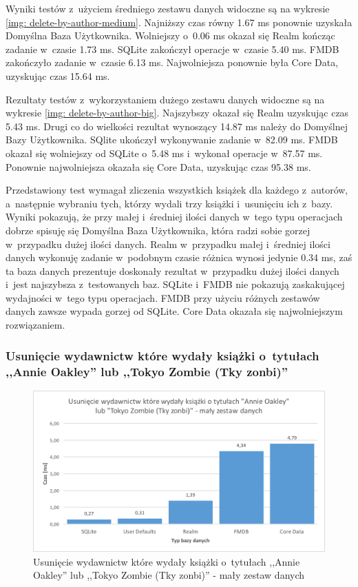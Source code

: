 Wyniki testów z~użyciem średniego zestawu danych widoczne są na wykresie \ref{img: delete-by-author-medium}. Najniższy czas równy 1.67 ms ponownie uzyskała Domyślna Baza Użytkownika. Wolniejszy o~0.06 ms okazał się Realm kończąc zadanie w~czasie 1.73 ms. SQLite zakończył operacje w~czasie 5.40 ms. FMDB zakończyło zadanie w~czasie 6.13 ms. Najwolniejsza ponownie była Core Data, uzyskując czas 15.64 ms.

Rezultaty testów z~wykorzystaniem dużego zestawu danych widoczne są na wykresie \ref{img: delete-by-author-big}. Najszybszy okazał się Realm uzyskując czas 5.43 ms. Drugi co do wielkości rezultat wynoszący 14.87 ms należy do Domyślnej Bazy Użytkownika. SQlite ukończył wykonywanie zadanie w~82.09 ms. FMDB okazał się wolniejszy od SQLite o~5.48 ms i~wykonał operacje w~87.57 ms. Ponownie najwolniejsza okazała się Core Data, uzyskując czas 95.38 ms.

Przedstawiony test wymagał zliczenia wszystkich książek dla każdego z~autorów, a~następnie wybraniu tych, którzy wydali trzy książki i~usunięciu ich z~bazy. Wyniki pokazują, że przy małej i~średniej ilości danych w~tego typu operacjach dobrze spisuję się Domyślna Baza Użytkownika, która radzi sobie gorzej w~przypadku dużej ilości danych. Realm w~przypadku małej i~średniej ilości danych wykonuję zadanie w~podobnym czasie różnica wynosi jedynie 0.34 ms, zaś ta baza danych prezentuje doskonały rezultat w~przypadku dużej ilości danych i~jest najszybsza z~testowanych baz. SQLite i~FMDB nie pokazują zaskakującej wydajności w~tego typu operacjach. FMDB przy użyciu różnych zestawów danych zawsze wypada gorzej od SQLite. Core Data okazała się najwolniejszym rozwiązaniem.

\subsubsection{Usunięcie wydawnictw które wydały książki o~tytułach ,,Annie Oakley'' lub ,,Tokyo Zombie (Tky zonbi)''}

\begin{figure}[H]
    \centering\includegraphics[width=\linewidth]{img/delete_data/delete_by_publisher/delete_by_publisher_small_test.png}
    \caption{Usunięcie wydawnictw które wydały książki o~tytułach ,,Annie Oakley'' lub ,,Tokyo Zombie (Tky zonbi)'' - mały zestaw danych}
    \label{img: delete-by-publisher-small}
\end{figure}

